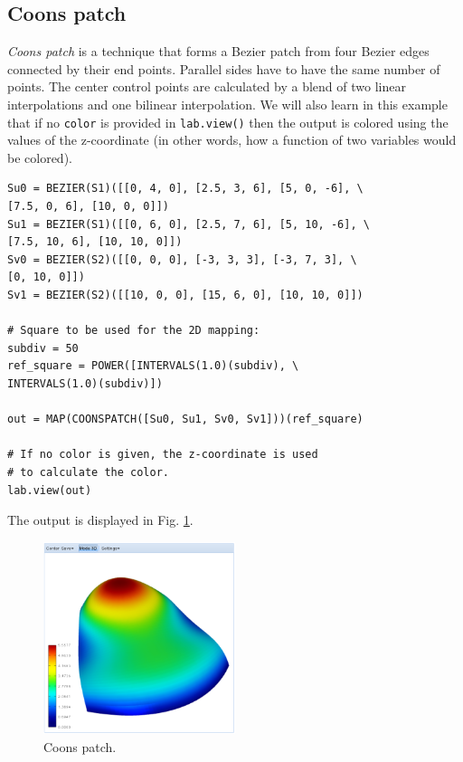 \documentclass{article}
\begin{document}
\subsection{Coons patch}

{\em Coons patch} is a technique that forms a Bezier patch from four Bezier edges connected 
by their end points. Parallel sides have to have the same number of points. The center control 
points are calculated by a blend of two linear interpolations and one bilinear interpolation.
We will also learn in this example that if no {\tt color} is provided in {\tt lab.view()}
then the output is colored using the values of the z-coordinate (in other words, how a function
of two variables would be colored).

\begin{verbatim}
Su0 = BEZIER(S1)([[0, 4, 0], [2.5, 3, 6], [5, 0, -6], \
[7.5, 0, 6], [10, 0, 0]])
Su1 = BEZIER(S1)([[0, 6, 0], [2.5, 7, 6], [5, 10, -6], \
[7.5, 10, 6], [10, 10, 0]])
Sv0 = BEZIER(S2)([[0, 0, 0], [-3, 3, 3], [-3, 7, 3], \
[0, 10, 0]])
Sv1 = BEZIER(S2)([[10, 0, 0], [15, 6, 0], [10, 10, 0]])

# Square to be used for the 2D mapping:
subdiv = 50
ref_square = POWER([INTERVALS(1.0)(subdiv), \
INTERVALS(1.0)(subdiv)])

out = MAP(COONSPATCH([Su0, Su1, Sv0, Sv1]))(ref_square)
	 
# If no color is given, the z-coordinate is used 
# to calculate the color. 
lab.view(out)
\end{verbatim}
The output is displayed in Fig. \ref{fig:curves-3}.

\begin{figure}[!ht]
\begin{center}
\includegraphics[width=0.5\textwidth]{img/curves-3.png}
\end{center}
\vspace{-2mm}
\caption{Coons patch.}
\label{fig:curves-3}
\end{figure}
\end{document}
